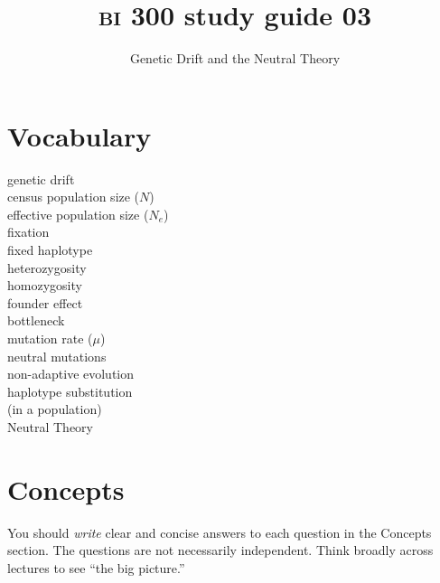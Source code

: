 \documentclass[letterpaper]{tufte-handout}
\title{{\scshape bi} 300 study guide 03\hfill}
\author{Genetic Drift and the Neutral Theory}
\date{} %
\begin{document}
\maketitle	%


\section{Vocabulary}
\vspace{-1\baselineskip}
\begin{multicols}{2}
genetic drift\\
census population size ($N$)\\
effective population size ($N_e$)\\
fixation\\
fixed haplotype\\
heterozygosity\\
homozygosity\\
founder effect\\
bottleneck\\
mutation rate ($\mu$)\\
neutral mutations\\
non-adaptive evolution\\
haplotype substitution\\\hspace{1em}(in a population)\\
Neutral Theory
\end{multicols}

\section{Concepts}

You should \emph{write} clear and concise answers to each question in the Concepts section.  The questions are not necessarily independent.  Think broadly across lectures to see ``the big picture.'' 
\end{document}

